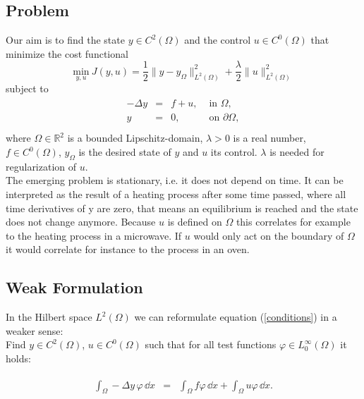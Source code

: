 \documentclass[a4paper, 11pt, twoside]{article}
\begin{document}
\subsection{Problem}
Our aim is to find the state $y \in C^2(\Omega)$ and the control $u \in C^0(\Omega)$ that minimize the cost functional
\begin{equation}\label{objectivefunctional}
 \underset{y, u}{\text{min}} ~J(y,u)=\frac{1}{2} \|y-y_{\Omega}\|^2_{L^2(\Omega)}+\frac{\lambda}{2}\|u\|^2_{L^2(\Omega)}
\end{equation} 
subject to
\begin{eqnarray}\label{conditions}
\begin{array}{rcll}
-\Delta y &=& f+u, & \text{ in }\Omega,\\
        y&=& 0, & \text{ on }\partial\Omega, \\

\end{array}
\end{eqnarray}
where $\Omega \in \mathbb{R} ^2$ is a bounded Lipschitz-domain, $\lambda > 0$  is a real number, $f \in C^0(\Omega)$, $y_{\Omega}$ is the desired state of $y$ and $u$ its control. $\lambda$ is needed for regularization of $u$. \\
The emerging problem is stationary, i.e. it does not depend on time. It can be interpreted as the result of a heating process after some time passed, where all time derivatives of y are zero, that means an equilibrium is reached and the state does not change anymore. Because $u$ is defined on $\Omega$ this correlates for example to the heating process in a microwave. If $u$ would only act on the boundary of $\Omega$ it would correlate for instance to the process in an oven. \\


\subsection{Weak Formulation}\label{sectionWeak_formulation}

In the Hilbert space $L^2(\Omega)$ we can reformulate equation (\ref{conditions}) in a weaker sense: \\
Find $y \in C^2(\Omega)$, $u \in C^0(\Omega)$ such that for all test functions $\varphi\in L^\infty_0(\Omega)$ it holds:

\begin{eqnarray}\label{var_formulation}
\begin{array}{rcl}
\int_\Omega - \Delta y\, \varphi\, \dd x &=& \int_\Omega f\varphi\, \dd x + \int_\Omega u\varphi\, \dd x. \\
\end{array}
\end{eqnarray}
\end{document}
